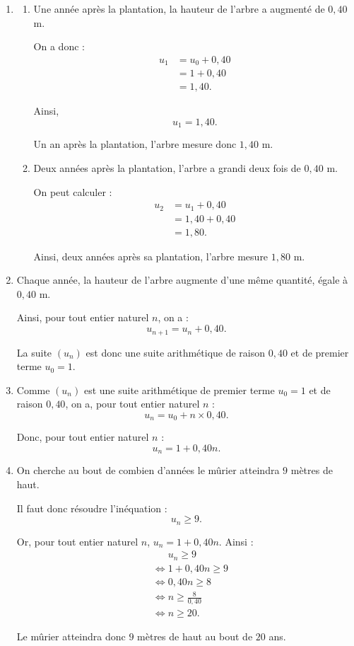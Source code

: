 			\begin{enumerate}
				\item \begin{enumerate}
					\item Une année après la plantation, la hauteur de l'arbre a augmenté de $0{,}40$ m.
					
					On a donc :
					\begin{align*}
						u_1&=u_0+0{,}40\\
						&=1+0{,}40\\
						&=1{,}40.
					\end{align*}
					
					Ainsi,
					\[
					u_1=1{,}40.
					\]
					
					Un an après la plantation, l'arbre mesure donc $1{,}40$ m.
					
					\item Deux années après la plantation, l'arbre a grandi deux fois de $0{,}40$ m.
					
					On peut calculer :
					\begin{align*}
						u_2&=u_1+0{,}40\\
						&=1{,}40+0{,}40\\
						&=1{,}80.
					\end{align*}
					
					Ainsi, deux années après sa plantation, l'arbre mesure $1{,}80$ m.
				\end{enumerate}
				
				\item Chaque année, la hauteur de l'arbre augmente d'une même quantité, égale à $0{,}40$ m.
				
				Ainsi, pour tout entier naturel $n$, on a :
				\[
				u_{n+1}=u_n+0{,}40.
				\]
				
				La suite $(u_n)$ est donc une suite arithmétique de raison $0{,}40$ et de premier terme $u_0=1$.
				
				\item Comme $(u_n)$ est une suite arithmétique de premier terme $u_0=1$ et de raison $0{,}40$, on a, pour tout entier naturel $n$ :
				\[
				u_n=u_0+n\times 0{,}40.
				\]
				
				Donc, pour tout entier naturel $n$ :
				\[
				u_n=1+0{,}40n.
				\]
				
				\item On cherche au bout de combien d'années le mûrier atteindra $9$ mètres de haut.
				
				Il faut donc résoudre l'inéquation :
				\[
				u_n\geq 9.
				\]
				
				Or, pour tout entier naturel $n$, $u_n=1+0{,}40n$. Ainsi :
				\begin{align*}
					&\phantom{\iff}u_n\geq 9\\
					&\iff 1+0{,}40n\geq 9\\
					&\iff 0{,}40n\geq 8\\
					&\iff n\geq \frac{8}{0{,}40}\\
					&\iff n\geq 20.
				\end{align*}
				
				Le mûrier atteindra donc $9$ mètres de haut au bout de $20$ ans.
			\end{enumerate}
			
